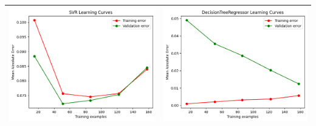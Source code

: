 \begin{table}[H]
    \centering
    \footnotesize
    \setlength\tabcolsep{0pt}
    \begin{tabularx}{\textwidth}{|X|X|}
        \hline
        \includegraphics[width=\linewidth, trim=0 0 0 0]{images/SVR_lc2.png} &
        \includegraphics[width=\linewidth, trim=0 0 0 0]{images/DecisionTree_lc2.png} \\
        \hline

\end{tabularx}
\end{table}
